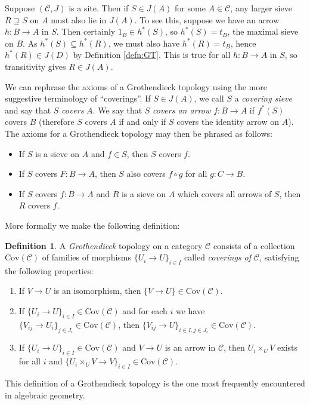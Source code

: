\documentclass{article}
\def\~#1{\mathscr{#1}}
\numberwithin{equation}{section}
\numberwithin{figure}{section}
\newcommand{\Cov}{\mathrm{Cov}}
\theoremstyle{plain}
\theoremstyle{definition}
\newtheorem{defn}[thm]{Definition}
\theoremstyle{remark}
\begin{document}
Suppose $(\~C, J)$ is a site. Then if $S \in J(A)$ for some $A \in \~C$, any larger sieve $R \supseteq S$ on $A$ must also lie in $J(A)$. To see this, suppose we have an arrow $h: B \to A$ in $S$. Then certainly $1_B \in h^*(S)$, so $h^*(S) = t_B$, the maximal sieve on $B$. As $h^*(S) \subseteq h^*(R)$, we must also have $h^*(R) = t_B$, hence $h^*(R) \in J(D)$ by Definition \ref{defn:GT}. This is true for all $h: B \to A$ in $S$, so transitivity gives $R \in J(A)$.

We can rephrase the axioms of a Grothendieck topology using the more suggestive terminology of ``coverings''. If $S \in J(A)$, we call $S$ a \emph{covering sieve} and say that $S$ \emph{covers} $A$. We say that $S$ \emph{covers an arrow $f: B \to A$} if $f^*(S)$ covers $B$ (therefore $S$ covers $A$ if and only if $S$ covers the identity arrow on $A$). The axioms for a Grothendieck topology may then be phrased as follows:
\begin{itemize}
    \item[1*.] If $S$ is a sieve on $A$ and $f \in S$, then $S$ covers $f$. 
    \item[2*.] If $S$ covers $F: B \to A$, then $S$ also covers $f \circ g$ for all $g: C \to B$.
    \item[3*.] If $S$ covers $f: B \to A$ and $R$ is a sieve on $A$ which covers all arrows of $S$, then $R$ covers $f$. 
\end{itemize}
More formally we make the following definition:
\begin{defn}\label{defn:GT2}
    A \emph{Grothendieck} topology on a category $\~C$ consists of a collection $\Cov(\~C)$ of families of morphisms $\{U_i \to U\}_{i \in I}$ called \emph{coverings of $\~C$}, satisfying the following properties:
    \begin{enumerate}
        \item If $V \to U$ is an isomorphism, then $\{V \to U\} \in \Cov(\~C)$.
        \item If $\{U_i \to U\}_{i \in I} \in \Cov(\~C)$ and for each $i$ we have $\{V_{ij} \to U_i\}_{j \in J_i} \in \Cov(\~C)$, then $\{V_{ij} \to U\}_{i \in I, j \in J_i} \in \Cov(\~C)$.
        \item If $\{U_i \to U\}_{i \in I} \in \Cov(\~C)$ and $V \to U$ is an arrow in $\~C$, then $U_i \times_{U} V$ exists for all $i$ and $\{U_i \times_{U} V \to V\}_{i \in I} \in \Cov(\~C)$.
    \end{enumerate}
\end{defn}
This definition of a Grothendieck topology is the one most frequently encountered in algebraic geometry.
\end{document}
